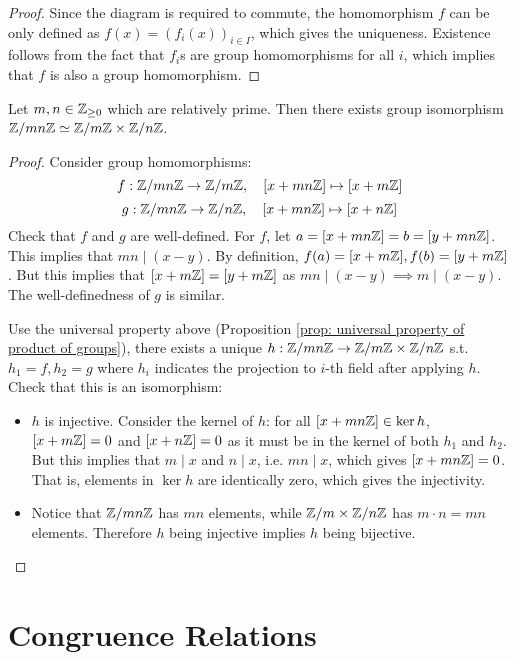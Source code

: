 \documentclass{article}
\begin{document}
\begin{proof}
    Since the diagram is required to commute, the homomorphism $f$ can be only defined as $f(x) = (f_i(x))_{i \in I}$, which gives the uniqueness. Existence follows from the fact that $f_i$s are group homomorphisms for all $i$, which implies that $f$ is also a group homomorphism.
\end{proof}

\begin{example}
    Let $m, n \in \mathbb{Z}_{\geq 0}$ which are relatively prime. Then there exists group isomorphism $\mathbb{Z}/mn\mathbb{Z} \simeq \mathbb{Z}/m\mathbb{Z} \times \mathbb{Z}/n\mathbb{Z}$.
\end{example}

\begin{proof}
    Consider group homomorphisms: 
    \[
        f: \mathbb{Z}/mn\mathbb{Z} \to \mathbb{Z}/m\mathbb{Z}, \quad [x + mn\mathbb{Z}] \mapsto [x + m\mathbb{Z}]
    \]
    \[
        g: \mathbb{Z}/mn\mathbb{Z} \to \mathbb{Z}/n\mathbb{Z}, \quad [x + mn\mathbb{Z}] \mapsto [x + n\mathbb{Z}]
    \]
    Check that $f$ and $g$ are well-defined. For $f$, let $a = [x + mn\mathbb{Z}] = b = [y + mn\mathbb{Z}]$. This implies that $mn \mid (x - y)$. By definition, $f(a) = [x + m\mathbb{Z}], f(b) = [y + m\mathbb{Z}]$. But this implies that $[x + m\mathbb{Z}] = [y + m\mathbb{Z}]$ as $mn \mid (x - y) \implies m \mid (x - y)$. The well-definedness of $g$ is similar.

    Use the universal property above (Proposition \ref{prop: universal property of product of groups}), there exists a unique $h: \mathbb{Z}/mn\mathbb{Z} \to \mathbb{Z}/m\mathbb{Z} \times \mathbb{Z}/n\mathbb{Z}$ s.t. $h_1 = f, h_2 = g$ where $h_i$ indicates the projection to $i$-th field after applying $h$. Check that this is an isomorphism:
    \begin{itemize}
        \item $h$ is injective. Consider the kernel of $h$: for all $[x + mn\mathbb{Z}] \in \ker h$, $[x + m\mathbb{Z}] = 0$ and $[x + n\mathbb{Z}] = 0$ as it must be in the kernel of both $h_1$ and $h_2$. But this implies that $m \mid x$ and $n \mid x$, i.e. $mn \mid x$, which gives $[x + mn\mathbb{Z}] = 0$. That is, elements in $\ker h$ are identically zero, which gives the injectivity.
        \item Notice that $\mathbb{Z}/mn\mathbb{Z}$ has $mn$ elements, while $\mathbb{Z}/m \times \mathbb{Z}/n\mathbb{Z}$ has $m \cdot n = mn$ elements. Therefore $h$ being injective implies $h$ being bijective. 
    \end{itemize}
\end{proof}

\section{Congruence Relations}
\end{document}
